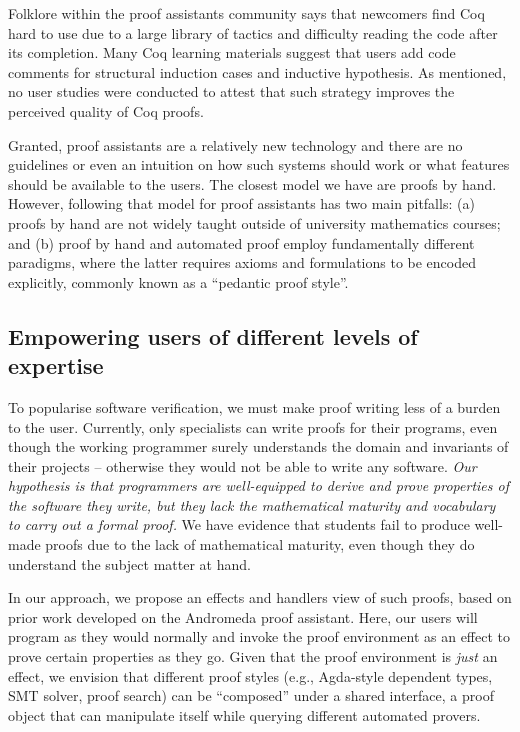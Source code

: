 \documentclass[sigconfl]{acmart}
\begin{document}
Folklore within the proof assistants community says that newcomers
find Coq hard to use due to a large library of tactics and difficulty reading
the code after its completion. Many Coq learning materials suggest that users
add code comments for structural induction cases and inductive hypothesis. As
mentioned, no user studies were conducted to attest that such strategy improves
the perceived quality of Coq proofs.

Granted, proof assistants are a relatively new technology
and there are no guidelines or even an intuition on how such systems should
work or what features should be available to the users. The closest model we
have are proofs by hand. However, following that model for proof assistants has
two main pitfalls: (a) proofs by hand are not widely taught outside of
university mathematics courses; and (b) proof by hand and automated proof
employ fundamentally different paradigms, where the latter requires
axioms and formulations to be encoded explicitly, commonly known as a ``pedantic
proof style''.

\subsection{Empowering users of different levels of expertise}

To popularise software verification, we must make proof writing less of a
burden to the user. Currently, only specialists can write proofs for their
programs, even though the working programmer surely understands the domain and
invariants of their projects -- otherwise they would not be able to write any
software. \textit{Our hypothesis is that programmers are well-equipped to derive and
prove properties of the software they write, but they lack the mathematical maturity and
vocabulary to carry out a formal proof.} We have evidence that students fail to
produce well-made proofs due to the lack of mathematical maturity, even though
they do understand the subject matter at hand.

In our approach, we propose an effects and handlers view of such
proofs, based on prior work developed on the Andromeda proof assistant. Here,
our users will program as they would normally and invoke
the proof environment as an effect to prove certain properties as they go. Given
that the proof environment is \textit{just} an effect, we envision that different proof
styles (e.g., Agda-style dependent types, SMT solver, proof search) can be ``composed''
under a shared interface, a proof object that can manipulate itself while
querying different automated provers.
\end{document}
